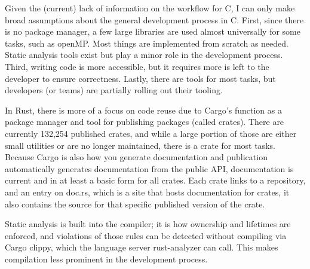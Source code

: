 \documentclass[conference]{IEEEtran}
\begin{document}
Given the (current) lack of information on the workflow for C, I can only make broad assumptions about the general development process in C. First, since there is no package manager, a few large libraries are used almost universally for some tasks, such as openMP. Most things are implemented from scratch as needed.
Static analysis tools exist but play a minor role in the development process. Third, writing code is more accessible, but it requires more is left to the developer to ensure correctness. Lastly, there are tools for most tasks, but developers (or teams) are partially rolling out their tooling.

In Rust, there is more of a focus on code reuse due to Cargo's function as a package manager and tool for publishing packages (called crates). There are currently 132,254 published crates, and while a large portion of those are either small utilities or are no longer maintained, there is a crate for most tasks. Because Cargo is also how you generate documentation and publication automatically generates documentation from the public API, documentation is current and in at least a basic form for all crates. Each crate links to a repository, and an entry on doc.rs, which is a site that hosts documentation for crates, it also contains the source for that specific published version of the crate.

Static analysis is built into the compiler; it is how ownership and lifetimes are enforced, and violations of those rules can be detected without compiling via Cargo clippy, which the language server rust-analyzer can call. This makes compilation less prominent in the development process.

\end{document}

